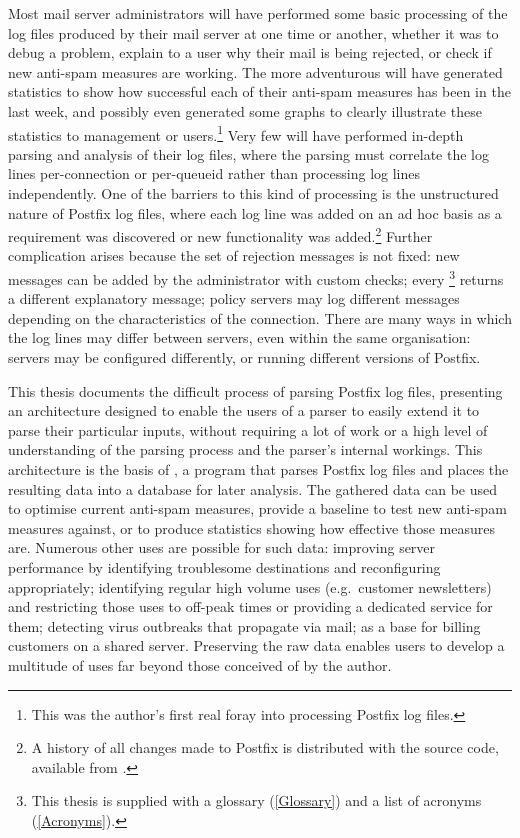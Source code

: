 Most mail server administrators will have performed some basic processing
of the log files produced by their mail server at one time or another,
whether it was to debug a problem, explain to a user why their mail is
being rejected, or check if new anti-spam measures are working.  The more
adventurous will have generated statistics to show how successful each of
their anti-spam measures has been in the last week, and possibly even
generated some graphs to clearly illustrate these statistics to management
or users.\footnote{This was the author's first real foray into processing
Postfix log files.}  Very few will have performed in-depth parsing and
analysis of their log files, where the parsing must correlate the log lines
per-connection or per-queueid rather than processing log lines
independently.  One of the barriers to this kind of processing is the
unstructured nature of Postfix log files, where each log line was added on
an ad hoc basis as a requirement was discovered or new functionality was
added.\footnote{A history of all changes made to Postfix is distributed
with the source code, available from
.}  Further
complication arises because the set of rejection messages is not fixed: new
messages can be added by the administrator with custom checks; every
\footnote{This thesis is supplied with a glossary
(\textsection\ref{Glossary}) and a list of acronyms
(\textsection\ref{Acronyms}).} returns a different explanatory message;
policy servers may log different messages depending on the characteristics
of the connection.  There are many ways in which the log lines may differ
between servers, even within the same organisation: servers may be
configured differently, or running different versions of Postfix.

This thesis documents the difficult process of parsing Postfix log files,
presenting an architecture designed to enable the users of a parser to
easily extend it to parse their particular inputs, without requiring a lot
of work or a high level of understanding of the parsing process and the
parser's internal workings.  This architecture is the basis of
\parsername{}, a program that parses Postfix log files and places the
resulting data into a database for later analysis.  The gathered data can
be used to optimise current anti-spam measures, provide a baseline to test
new anti-spam measures against, or to produce statistics showing how
effective those measures are.  Numerous other uses are possible for such
data: improving server performance by identifying troublesome destinations
and reconfiguring appropriately; identifying regular high volume uses
(e.g.\ customer newsletters) and restricting those uses to off-peak times
or providing a dedicated service for them; detecting virus outbreaks that
propagate via mail; as a base for billing customers on a shared server.
Preserving the raw data enables users to develop a multitude of uses far
beyond those conceived of by the author.

